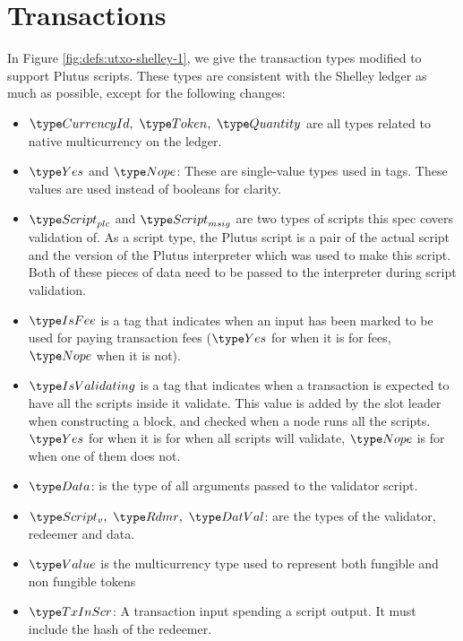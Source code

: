 \section{Transactions}
\label{sec:transactions}

In Figure \ref{fig:defs:utxo-shelley-1}, we give the transaction types modified
to support Plutus scripts. These types are consistent with the Shelley ledger
as much as possible,
except for the following changes:

\begin{itemize}
  \item $\CurrencyId,~\Token,~\Quantity$ are all types
  related to native multicurrency on the ledger.

  \item $\Yes$ and $\Nope$: These are single-value types used in tags. These
  values are used instead of booleans for clarity.

  \item $\ScriptPlutus$ and $\ScriptMSig$ are two types of scripts this spec
  covers validation of. As a script type, the Plutus script is a pair of the
  actual script and the version of the Plutus interpreter which was used to
  make this script. Both of these pieces of data need to be passed to the
  interpreter during script validation.

  \item $\IsFee$ is a tag that indicates when an input has been marked
  to be used for paying transaction fees ($\Yes$ for when it is for fees,
  $\Nope$ when it is not).

  \item $\IsValidating$ is a tag that indicates when a transaction is
  expected to have all the scripts inside it validate.
  This value is added by the slot leader when
  constructing a block, and checked when a node runs all the scripts.
  $\Yes$ for when it is for when all scripts will validate,
  $\Nope$ is for when one of them does not.

  \item $\Data$: is the type of all arguments passed to the validator script.

  \item $\ScriptV,~ \Rdmr,~ \DatVal$: are the types of the validator,
  redeemer and data.

  \item $\Value$ is the multicurrency type used to represent
  both fungible and non fungible tokens

  \item $\TxInScr$: A transaction input spending a script output. It must
  include the hash of the redeemer.


\end{itemize}
